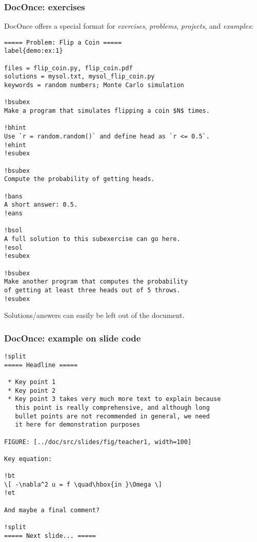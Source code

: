 \documentclass{beamer}
\begin{document}
\begin{frame}
\frametitle{DocOnce: exercises}

DocOnce offers a special format for \emph{exercises}, \emph{problems}, \emph{projects},
and \emph{examples}:

\begin{Verbatim}[numbers=none,fontsize=\fontsize{9pt}{9pt},baselinestretch=0.95]
===== Problem: Flip a Coin =====
label{demo:ex:1}

files = flip_coin.py, flip_coin.pdf
solutions = mysol.txt, mysol_flip_coin.py
keywords = random numbers; Monte Carlo simulation

!bsubex
Make a program that simulates flipping a coin $N$ times.

!bhint
Use `r = random.random()` and define head as `r <= 0.5`.
!ehint
!esubex

!bsubex
Compute the probability of getting heads.

!bans
A short answer: 0.5.
!eans

!bsol
A full solution to this subexercise can go here.
!esol
!esubex

!bsubex
Make another program that computes the probability
of getting at least three heads out of 5 throws.
!esubex
\end{Verbatim}

Solutions/answers can easily be left out of the document.
\end{frame}

\begin{frame}
\frametitle{DocOnce: example on slide code}

\begin{Verbatim}[numbers=none,fontsize=\fontsize{9pt}{9pt},baselinestretch=0.95]
!split
===== Headline =====

 * Key point 1
 * Key point 2
 * Key point 3 takes very much more text to explain because
   this point is really comprehensive, and although long
   bullet points are not recommended in general, we need
   it here for demonstration purposes

FIGURE: [../doc/src/slides/fig/teacher1, width=100]

Key equation:

!bt
\[ -\nabla^2 u = f \quad\hbox{in }\Omega \]
!et

And maybe a final comment?

!split
===== Next slide... =====
\end{Verbatim}
\end{frame}
\end{document}
